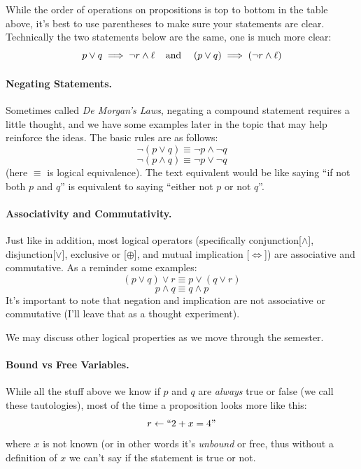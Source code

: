 While the order of operations on propositions is top to bottom in the table above, 
it's best to use parentheses to make sure your statements are clear. 
Technically the two statements below are the same, one is much more clear:
\[
p \vee q \implies \neg r \wedge \ell \;\;\;\; \textnormal{and}\;\;\;\; \left(p\vee q\right) \implies \left(\neg r \wedge \ell\right) 
\]

\paragraph{Negating Statements.}
Sometimes called \emph{De Morgan's Laws}, negating a compound statement requires a little thought, 
and we have some examples later in the topic that may help reinforce the ideas. 
The basic rules are as follows:
\[ \neg\left(p \vee q\right) \equiv \neg p \wedge \neg q\]
\[ \neg\left(p \wedge q\right) \equiv \neg p \vee \neg q\]
(here $\equiv$ is logical equivalence).
The text equivalent would be like saying ``if not both $p$ and $q$'' is equivalent to saying ``either not $p$ or not $q$''.

\paragraph{Associativity and Commutativity.}
Just like in addition, most logical operators (specifically conjunction[$\wedge$], disjunction[$\vee$], exclusive or [$\oplus$], and mutual implication [$\iff$]) are associative and commutative.
As a reminder some examples:
\begin{equation}
\left(p \vee q\right) \vee r \equiv p \vee \left(q \vee r\right) \tag{associativity}
\end{equation}
\begin{equation}
p \wedge q \equiv q \wedge p \tag{commutativity}
\end{equation}
It's important to note that negation and implication are not associative or commutative (I'll leave that as a thought experiment).

We may discuss other logical properties as we move through the semester.  

\paragraph{Bound vs Free Variables.} While all the stuff above we know if $p$ and $q$ are \textit{always} true or false (we call these tautologies), 
most of the time a proposition looks more like this: 
\[ r \leftarrow \textnormal{``}2+x=4\textnormal{''}\]
where $x$ is not known (or in other words it's \emph{unbound} or free, thus without a definition of $x$ we can't say if the statement is true or not. 

